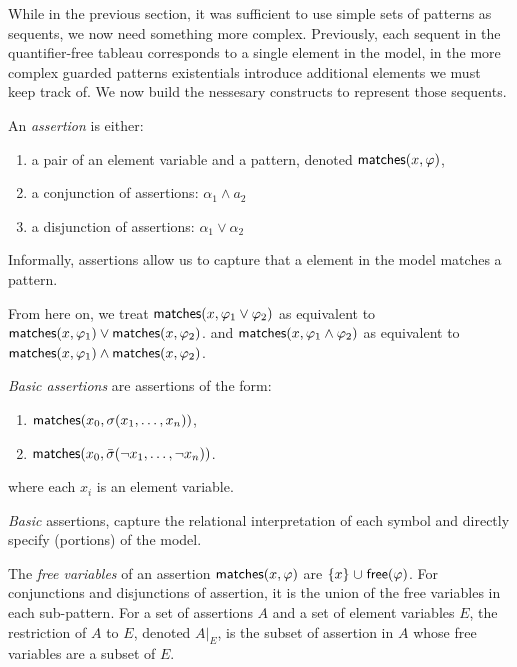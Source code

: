 While in the previous section, it was sufficient to use simple sets of patterns as sequents,
we now need something more complex.
Previously, each sequent in the quantifier-free tableau corresponds to a single
element in the model, in the more complex guarded patterns existentials
introduce additional elements we must keep track of.
We now build the nessesary constructs to represent those sequents.

\begin{definition}[Assertion]An \emph{assertion} is either:

\begin{enumerate}
\def\labelenumi{\arabic{enumi}.}
\tightlist
\item
  a pair of an element variable and a pattern, denoted \(\mathsf{matches}(x,\allowbreak \varphi)\),
\item
  a conjunction of assertions: \(\alpha_1 \land a_2\)
\item
  a disjunction of assertions: \(\alpha_1 \lor \alpha_2\)
\end{enumerate}

\end{definition}

Informally, assertions allow us to capture that a element in the model matches a pattern.

From here on, we treat \(\mathsf{matches}(x,\allowbreak \varphi_1\lor\varphi_2)\) as equivalent to
\(\mathsf{matches}(x,\allowbreak \varphi_1) \lor \mathsf{matches}(x,\allowbreak \varphi_2)\).
and \(\mathsf{matches}(x,\allowbreak \varphi_1\land\varphi_2)\) as equivalent to
\(\mathsf{matches}(x,\allowbreak \varphi_1) \land \mathsf{matches}(x,\allowbreak \varphi_2)\).

\begin{definition}\emph{Basic assertions} are assertions of the form:

\begin{enumerate}
\def\labelenumi{\arabic{enumi}.}
\tightlist
\item
  \(\mathsf{matches}(x_0,\allowbreak \sigma(x_1, \ldots, x_n))\),
\item
  \(\mathsf{matches}(x_0,\allowbreak \bar\sigma(\lnot x_1, \ldots, \lnot x_n))\).
\end{enumerate}

where each \(x_i\) is an element variable.\end{definition}

\emph{Basic} assertions, capture the relational interpretation of each symbol
and directly specify (portions) of the model.

\begin{definition}[Restriction]The \emph{free variables} of an assertion \(\mathsf{matches}(x,\allowbreak \varphi)\) are \(\{x\} \mathrel{\cup} \mathsf{free}(\varphi)\).
For conjunctions and disjunctions of assertion, it is the union of the free variables
in each sub-pattern.
For a set of assertions \(A\) and a set of element variables \(E\),
the restriction of \(A\) to \(E\), denoted \(A|_{E}\),
is the subset of assertion in \(A\) whose free variables are a subset of \(E\).\end{definition}

